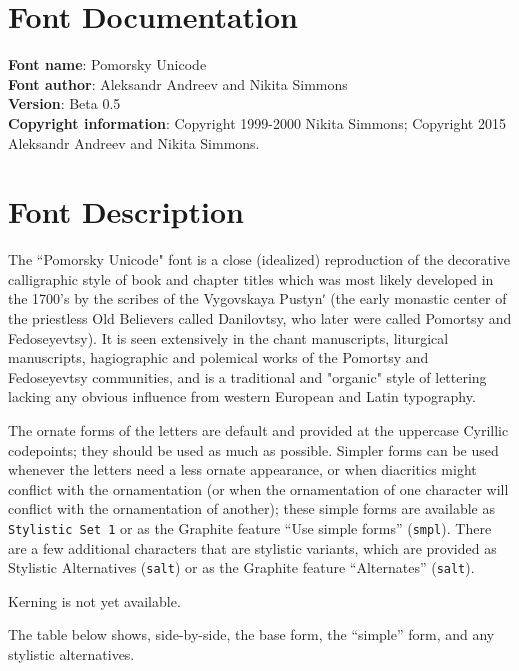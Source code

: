 \documentclass{article}
\begin{document}
\tabulinesep=1.2mm
\section{Font Documentation} 

 \textbf{Font name}: Pomorsky Unicode \\
\textbf{Font author}: Aleksandr Andreev and Nikita Simmons \\
\textbf{Version}: Beta 0.5 \\
\textbf{Copyright information}: Copyright 1999-2000 Nikita Simmons; Copyright 2015 Aleksandr Andreev and Nikita Simmons. \\

\section{Font Description}

The ``Pomorsky Unicode" font is a close (idealized) reproduction of the decorative calligraphic style of book and chapter titles which was most likely developed in the 1700's by the scribes of the Vygovskaya Pustynʹ (the early monastic center of the priestless Old Believers called Danilovtsy, who later were called Pomortsy and Fedoseyevtsy). It is seen extensively in the chant manuscripts, liturgical manuscripts, hagiographic and polemical works of the Pomortsy and Fedoseyevtsy communities, and is a traditional and "organic" style of lettering lacking any obvious influence from western European and Latin typography.

The ornate forms of the letters are default and provided at the uppercase Cyrillic codepoints; they should be used as much as possible. Simpler forms can be used whenever the letters need a less ornate appearance, or when diacritics might conflict with the ornamentation (or when the ornamentation of one character will conflict with the ornamentation of another); these simple forms are available as \verb+Stylistic Set 1+ or as the Graphite feature ``Use simple forms'' (\verb+smpl+). There are a few additional characters that are stylistic variants, which are provided as Stylistic Alternatives (\verb+salt+) or as the Graphite feature ``Alternates'' (\verb+salt+).

Kerning is not yet available.

The table below shows, side-by-side, the base form, the ``simple'' form, and any stylistic alternatives.
\end{document}
